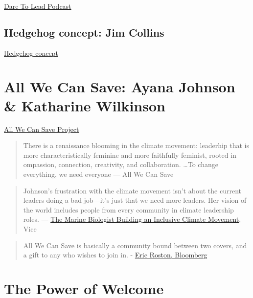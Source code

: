 \documentclass[
  letterpaper,
  DIV=11,
  numbers=noendperiod]{scrreprt}
\begin{document}
\href{https://brenebrown.com/dtl-podcast/}{Dare To Lead Podcast}

\hypertarget{hedgehog-concept-jim-collins}{%
\subsection{Hedgehog concept: Jim
Collins}\label{hedgehog-concept-jim-collins}}

\href{https://www.jimcollins.com/concepts/the-hedgehog-concept.html}{Hedgehog
concept}

\hypertarget{all-we-can-save-ayana-johnson-katharine-wilkinson}{%
\section{All We Can Save: Ayana Johnson \& Katharine
Wilkinson}\label{all-we-can-save-ayana-johnson-katharine-wilkinson}}

\href{https://www.allwecansave.earth/}{All We Can Save Project}

\begin{quote}
There is a renaissance blooming in the climate movement: leaderhip that
is more characteristically feminine and more faithfully feminist, rooted
in ompassion, connection, creativity, and collaboration. \ldots To
change everything, we need everyone --- All We Can Save
\end{quote}

\begin{quote}
Johnson's frustration with the climate movement isn't about the current
leaders doing a bad job---it's just that we need more leaders. Her
vision of the world includes people from every community in climate
leadership roles. ---
\href{https://www.vice.com/en/article/5dpyn3/the-marine-biologist-building-an-inclusive-climate-movement}{The
Marine Biologist Building an Inclusive Climate Movement}, Vice
\end{quote}

\begin{quote}
All We Can Save is basically a community bound between two covers, and a
gift to any who wishes to join in. -
\href{https://www.bloomberg.com/news/articles/2020-12-22/this-book-about-climate-change-will-give-you-hope}{Eric
Roston, Bloomberg}
\end{quote}

\hypertarget{the-power-of-welcome}{%
\section{The Power of Welcome}\label{the-power-of-welcome}}
\end{document}

